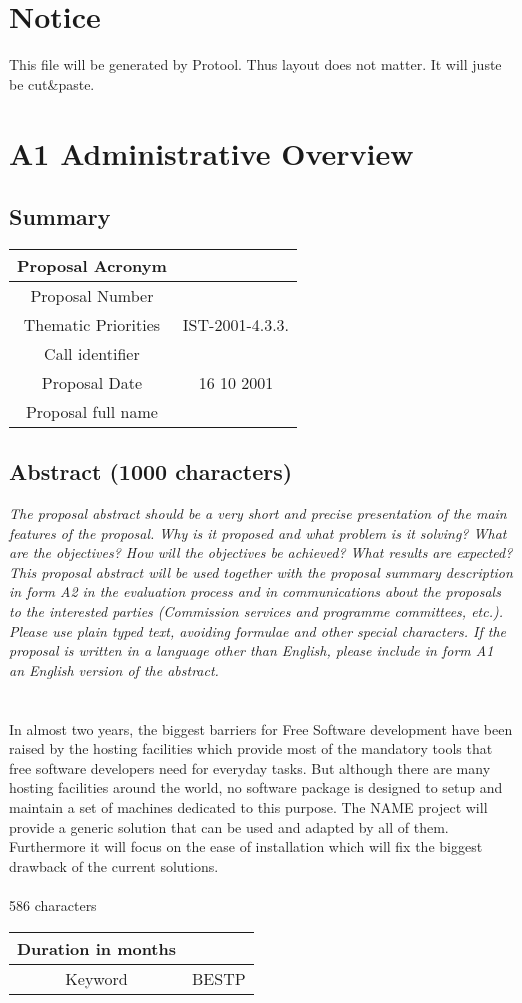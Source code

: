 \documentclass[a4paper,11pt]{report}
\begin{document}
\section*{Notice}
This file will be generated by Protool. Thus layout does not matter. It will
juste be cut\&paste.
\section*{A1 Administrative Overview}
\subsection*{Summary}
\begin{tabular}{|c|c|}
\hline
Proposal Acronym &  \\ \hline
Proposal Number &  \\ \hline
Thematic Priorities & IST-2001-4.3.3. \\ \hline
Call identifier & \\ \hline
Proposal Date & 16 10 2001 \\ \hline
Proposal full name & \\ \hline
\end{tabular}
\subsection*{Abstract (1000 characters)}
\textit{The proposal abstract should be a very short and precise presentation
of the main features of the proposal. Why is it proposed and what problem is it
solving? What are the objectives? How will the objectives be achieved? What
results are expected? This proposal abstract will be used together with the
proposal summary description in form A2 in the evaluation process and in
communications about the proposals to the interested parties (Commission
services and programme committees, etc.). Please use plain typed text, avoiding
formulae and other special characters. If the proposal is written in a language
other than English, please include in form A1 an English version of the
abstract.} \\ \\ \\
In almost two years, the biggest barriers for Free Software development have
been raised by the hosting facilities which provide most of the mandatory tools
that free software developers need for everyday tasks. But although there are
many hosting facilities around the world, no software package is designed to
setup and maintain a set of machines dedicated to this purpose. The NAME
project will provide a generic solution that can be used and adapted by all of
them. Furthermore it will focus on the ease of installation which will fix the
biggest drawback of the current solutions.
\\ \\ 
586 characters
\begin{tabular}{|c|c|}
\hline
Duration in months & \\ \hline
Keyword & BESTP \\ \hline
\end{tabular}
\end{document}
